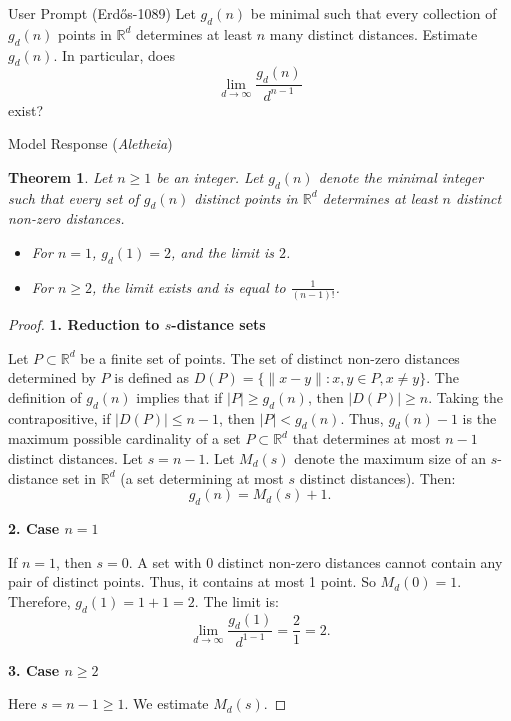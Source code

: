 \documentclass[11pt]{article}
\newtheorem{theorem}{Theorem}
\begin{document}
\begin{problem}{User Prompt (Erd\H{o}s-1089)}
Let $g_d(n)$ be minimal such that every collection of $g_d(n)$ points in $\mathbb{R}^d$ determines at least $n$ many distinct distances. Estimate $g_d(n)$. In particular, does\[\lim_{d\to \infty}\frac{g_d(n)}{d^{n-1}}\]exist?
\end{problem}

\begin{solution}{Model Response (\emph{Aletheia})}
\begin{theorem}
Let $n \ge 1$ be an integer. Let $g_d(n)$ denote the minimal integer such that every set of $g_d(n)$ distinct points in $\mathbb{R}^d$ determines at least $n$ distinct non-zero distances.
\begin{itemize}
\item For $n=1$, $g_d(1) = 2$, and the limit is $2$.
\item For $n \ge 2$, the limit exists and is equal to $\frac{1}{(n-1)!}$.
\end{itemize}
\end{theorem}

\begin{proof}
\textbf{1. Reduction to $s$-distance sets}

Let $P \subset \mathbb{R}^d$ be a finite set of points. The set of distinct non-zero distances determined by $P$ is defined as $D(P) = \{ \|x-y\| : x,y \in P, x \neq y \}$.
The definition of $g_d(n)$ implies that if $|P| \ge g_d(n)$, then $|D(P)| \ge n$.
Taking the contrapositive, if $|D(P)| \le n-1$, then $|P| < g_d(n)$.
Thus, $g_d(n) - 1$ is the maximum possible cardinality of a set $P \subset \mathbb{R}^d$ that determines at most $n-1$ distinct distances.
Let $s = n-1$. Let $M_d(s)$ denote the maximum size of an $s$-distance set in $\mathbb{R}^d$ (a set determining at most $s$ distinct distances).
Then:
\[ g_d(n) = M_d(s) + 1. \]

\textbf{2. Case $n=1$}

If $n=1$, then $s=0$.
A set with 0 distinct non-zero distances cannot contain any pair of distinct points. Thus, it contains at most 1 point.
So $M_d(0) = 1$.
Therefore, $g_d(1) = 1 + 1 = 2$.
The limit is:
\[ \lim_{d\to \infty} \frac{g_d(1)}{d^{1-1}} = \frac{2}{1} = 2. \]

\textbf{3. Case $n \ge 2$}

Here $s = n-1 \ge 1$. We estimate $M_d(s)$.


\end{proof}
\end{solution}
\end{document}
